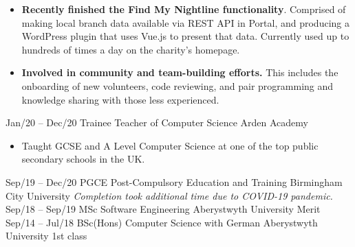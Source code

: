\documentclass[9pt]{developercv} %
\begin{document}
\begin{entrylist}
{\begin{itemize}[noitemsep,topsep=0pt,parsep=0pt,partopsep=0pt, leftmargin=-1pt]
            \item \textbf{Recently finished the Find My Nightline functionality}. Comprised of making local branch data available via REST API in Portal, and producing a WordPress plugin that uses Vue.js to present that data. Currently used up to hundreds of times a day on the charity's homepage.
            \item \textbf{Involved in community and team-building efforts.} This includes the onboarding of new volunteers, code reviewing, and pair programming and knowledge sharing with those less experienced.
        \end{itemize} 
        }
	\entry
		{Jan/20 -- Dec/20}
		{Trainee Teacher of Computer Science}
		{Arden Academy}
		{\vspace{-10pt}
        \begin{itemize}[noitemsep,topsep=0pt,parsep=0pt,partopsep=0pt, leftmargin=-1pt]
            \item Taught GCSE and A Level Computer Science at one of the top public secondary schools in the UK.
        \end{itemize} 
        }


\end{entrylist}

\vspace{-10 pt}
\begin{entrylist}
	\entry
        {Sep/19 -- Dec/20}
		{PGCE Post-Compulsory Education and Training}
		{Birmingham City University}
		{\textit{Completion took additional time due to COVID-19 pandemic.}}
	\entry
        {Sep/18 -- Sep/19}
		{MSc Software Engineering}
		{Aberystwyth University}
		{Merit}
  	\entry
        {Sep/14 -- Jul/18}
		{BSc(Hons) Computer Science with German}
		{Aberystwyth University}
		{1st class}
\end{entrylist}
\end{document}
